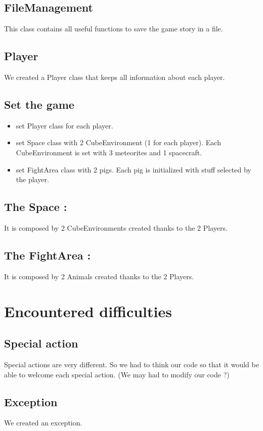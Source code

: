 \subsection{FileManagement}

This class contains all useful functions to save the game story in a file.

\subsection{Player}

We created a Player class that keeps all information about each player.

\subsection{Set the game}

\begin{itemize}
 \item set Player class for each player.
 \item set Space class with 2 CubeEnvironment (1 for each player). Each CubeEnvironment is set with 3 meteorites and 1 spacecraft.
 \item set FightArea class with 2 pigs. Each pig is initialized with stuff selected by the player.
\end{itemize}


\subsection{The Space :}

It is composed by 2 CubeEnvironments created thanks to the 2 Players.

\subsection{The FightArea :}

It is composed by 2 Animals created thanks to the 2 Players.


\section{Encountered difficulties}

\subsection{Special action}

Special actions are very different. So we had to think our code so that it would be able to welcome each special action.
(We may had to modify our code ?)

\subsection{Exception}

We created an exception.


